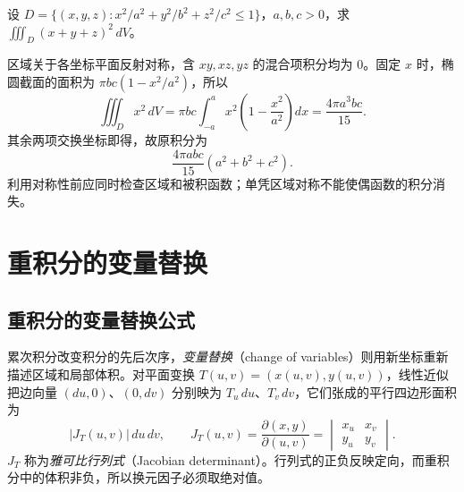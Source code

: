\documentclass[UTF8,12pt,a4paper,fontset=fandol]{ctexbook}
\begin{document}
\begin{example}
\label{ex:multiple-ellipsoid-second-moment}
设 $D=\{(x,y,z):x^2/a^2+y^2/b^2+z^2/c^2\leq1\}$，$a,b,c>0$，求 $\iiint_D(x+y+z)^2\,dV$。
\end{example}
\begin{solve}
区域关于各坐标平面反射对称，含 $xy,xz,yz$ 的混合项积分均为 $0$。固定 $x$ 时，椭圆截面的面积为 $\pi bc(1-x^2/a^2)$，所以
\[
    \iiint_Dx^2\,dV
    =\pi bc\int_{-a}^ax^2\left(1-\frac{x^2}{a^2}\right)dx
    =\frac{4\pi a^3bc}{15}.
\]
其余两项交换坐标即得，故原积分为
\[
    \frac{4\pi abc}{15}(a^2+b^2+c^2).
\]
利用对称性前应同时检查区域和被积函数；单凭区域对称不能使偶函数的积分消失。
\end{solve}

\section{重积分的变量替换}
\label{sec:change-of-variables-in-multiple-integrals}

\subsection{重积分的变量替换公式}
\label{subsec:change-of-variables-formula-for-multiple-integrals}

累次积分改变积分的先后次序，\emph{变量替换}（change of variables）则用新坐标重新描述区域和局部体积。对平面变换 $T(u,v)=(x(u,v),y(u,v))$，线性近似把边向量 $(du,0)$、$(0,dv)$ 分别映为 $T_u\,du$、$T_v\,dv$，它们张成的平行四边形面积为
\[
    |J_T(u,v)|\,du\,dv,\qquad
    J_T(u,v)=\frac{\partial(x,y)}{\partial(u,v)}
    =\begin{vmatrix}x_u&x_v\\y_u&y_v\end{vmatrix}.
\]
$J_T$ 称为\emph{雅可比行列式}（Jacobian determinant）。行列式的正负反映定向，而重积分中的体积非负，所以换元因子必须取绝对值。
\end{document}
